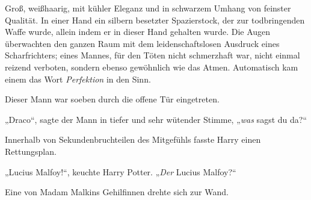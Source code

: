 Groß, weißhaarig, mit kühler Eleganz und in schwarzem Umhang von feinster Qualität. In einer Hand ein silbern besetzter Spazierstock, der zur todbringenden Waffe wurde, allein indem er in dieser Hand gehalten wurde. Die Augen überwachten den ganzen Raum mit dem leidenschaftslosen Ausdruck eines Scharfrichters; eines Mannes, für den Töten nicht schmerzhaft war, nicht einmal reizend verboten, sondern ebenso gewöhnlich wie das Atmen. Automatisch kam einem das Wort \emph{Perfektion} in den Sinn.

Dieser Mann war soeben durch die offene Tür eingetreten.

„Draco“, sagte der Mann in tiefer und sehr wütender Stimme, „\emph{was} sagst du da?“

Innerhalb von Sekundenbruchteilen des Mitgefühls fasste Harry einen Rettungsplan.

„Lucius Malfoy!“, keuchte Harry Potter. „\emph{Der} Lucius Malfoy?“

Eine von Madam Malkins Gehilfinnen drehte sich zur Wand.

